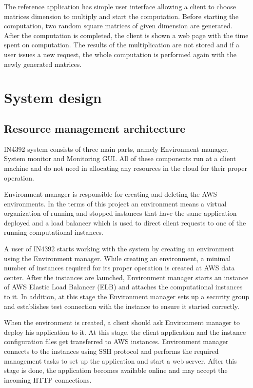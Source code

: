 \documentclass[conference]{IEEEtran}
\begin{document}
The reference application has simple user interface allowing a client to choose matrices dimension to multiply and start the computation. Before starting the computation, two random square matrices of given dimension are generated. After the computation is completed, the client is shown a web page with the time spent on computation. The results of the multiplication are not stored and if a user issues a new request, the whole computation is performed again with the newly generated matrices.

\section{System design}
\subsection{Resource management architecture}
IN4392 system consists of three main parts, namely Environment manager, System monitor and Monitoring GUI. All of these components run at a client machine and do not need in allocating any resources in the cloud for their proper operation.

Environment manager is responsible for creating and deleting the AWS environments. In the terms of this project an environment means a virtual organization of running and stopped instances that have the same application deployed and a load balancer which is used to direct client requests to one of the running computational instances.

A user of IN4392 starts working with the system by creating an environment using the Environment manager. While creating an environment, a minimal number of instances required for its proper operation is created at AWS data center. After the instances are launched, Environment manager starts an instance of AWS Elastic Load Balancer (ELB) and attaches the computational instances to it. In addition, at this stage the Environment manager sets up a security group and establishes test connection with the instance to ensure it started correctly.

When the environment is created, a client should ask Environment manager to deploy his application to it. At this stage, the client application and the instance configuration files get transferred to AWS instances. Environment manager connects to the instances using SSH protocol and performs the required management tasks to set up the application and start a web server. After this stage is done, the application becomes available online and may accept the incoming HTTP connections. 
\end{document}
